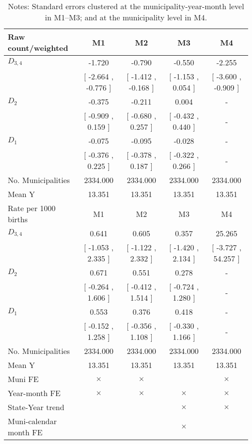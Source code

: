 \begin{table}[!ht]
\centering
\caption{Effects of Drought on macrosom}\label{tab:twfe_macrosom}
\fontsize{10pt}{12pt}\selectfont
\begin{tabular}{lcccc}
\toprule
  Raw count/weighted &\multicolumn{1}{c}{M1}&\multicolumn{1}{c}{M2}&\multicolumn{1}{c}{M3}&\multicolumn{1}{c}{M4} \\
\midrule
 $ D_{3,4} $ &    -1.720 &    -0.790 &    -0.550 &    -2.255 \\ 
 & [    -2.664 ,    -0.776 ] & [    -1.412 ,    -0.168 ] & [    -1.153 ,     0.054 ] & [    -3.600 ,    -0.909 ] \\ 
\addlinespace
 $ D_2 $ &    -0.375 &    -0.211 &     0.004 & - \\ 
 & [    -0.909 ,     0.159 ] & [    -0.680 ,     0.257 ] & [    -0.432 ,     0.440 ] & - \\ 
\addlinespace
 $ D_1 $ &    -0.075 &    -0.095 &    -0.028 & - \\ 
 & [    -0.376 ,     0.225 ] & [    -0.378 ,     0.187 ] & [    -0.322 ,     0.266 ] & - \\ 
\addlinespace
\midrule
  No. Municipalities &  2334.000 &  2334.000 &  2334.000 &  2334.000  \\
  Mean Y &    13.351 &    13.351 &    13.351 &    13.351  \\
\addlinespace
\midrule
  Rate per 1000 births &\multicolumn{1}{c}{M1}&\multicolumn{1}{c}{M2}&\multicolumn{1}{c}{M3}&\multicolumn{1}{c}{M4} \\
\midrule
 $ D_{3,4} $ &     0.641 &     0.605 &     0.357 &    25.265 \\ 
 & [    -1.053 ,     2.335 ] & [    -1.122 ,     2.332 ] & [    -1.420 ,     2.134 ] & [    -3.727 ,    54.257 ] \\ 
\addlinespace
 $ D_2 $ &     0.671 &     0.551 &     0.278 & - \\ 
 & [    -0.264 ,     1.606 ] & [    -0.412 ,     1.514 ] & [    -0.724 ,     1.280 ] & - \\ 
\addlinespace
 $ D_1 $ &     0.553 &     0.376 &     0.418 & - \\ 
 & [    -0.152 ,     1.258 ] & [    -0.356 ,     1.108 ] & [    -0.330 ,     1.166 ] & - \\ 
\midrule
  No. Municipalities &  2334.000 &  2334.000 &  2334.000 &  2334.000  \\
  Mean Y &    13.351 &    13.351 &    13.351 &    13.351  \\
  Muni FE & $ \times $ & $ \times $ &  & $ \times $  \\
  Year-month FE & $ \times $ & $ \times $ & $ \times $ & $ \times $ \\
  State-Year trend &  &  & $ \times $ & $ \times $ \\
  Muni-calendar month FE &  &  & $ \times $ & \\
\bottomrule
\end{tabular}
\caption*{\footnotesize{Notes: Standard errors clustered at the municipality-year-month level in M1--M3; and at the municipality level in M4.}}
\end{table}
